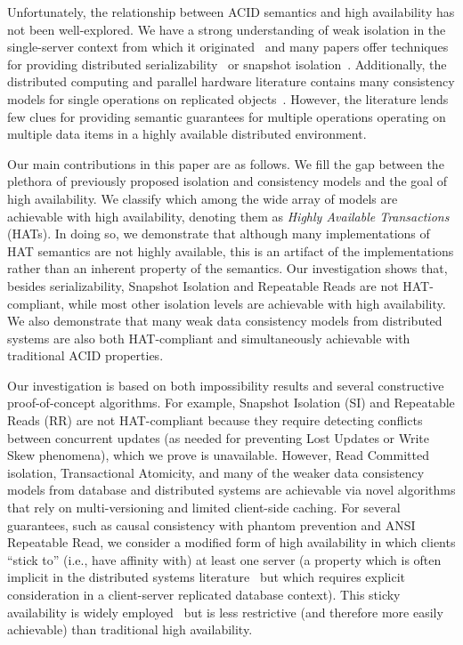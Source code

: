 Unfortunately, the relationship between ACID semantics and high
availability has not been well-explored. We have a strong
understanding of weak isolation in the single-server context from
which it originated~\cite{adya, ansicritique, gray-isolation} and many
papers offer techniques for providing distributed
serializability~\cite{bernstein-book, spanner, daudjee-session,
  hstore, krikellas-bargain, calvin, kemme-classification} or snapshot
isolation~\cite{daudjee-snapshot,generalizedsnapshot, kemme-snapshot,
  walter}. Additionally, the distributed computing and parallel
hardware literature contains many consistency models for single
operations on replicated objects~\cite{pnuts, herlihy-art, eiger, cac,
  sessionguarantees}. However, the literature lends few clues for
providing semantic guarantees for multiple operations operating on
multiple data items in a highly available distributed environment.

Our main contributions in this paper are as follows. We fill the gap
between the plethora of previously proposed isolation and consistency
models and the goal of high availability.  We classify which among the
wide array of models are achievable with high availability, denoting
them as {\em Highly Available Transactions} (HATs). In doing so, we
demonstrate that although many implementations of HAT semantics are
not highly available, this is an artifact of the implementations
rather than an inherent property of the semantics. Our investigation
shows that, besides serializability, Snapshot Isolation and Repeatable
Reads are not HAT-compliant, while most other isolation levels are
achievable with high availability. We also demonstrate that many weak
data consistency models from distributed systems are also both
HAT-compliant and simultaneously achievable with traditional ACID
properties.

Our investigation is based on both impossibility results and several
constructive proof-of-concept algorithms. For example, Snapshot
Isolation (SI) and Repeatable Reads (RR) are not HAT-compliant because
they require detecting conflicts between concurrent updates (as needed
for preventing Lost Updates or Write Skew phenomena), which we prove
is unavailable. However, Read Committed isolation, Transactional
Atomicity, and many of the weaker data consistency models from
database and distributed systems are achievable via novel algorithms
that rely on multi-versioning and limited client-side caching. For
several guarantees, such as causal consistency with phantom prevention
and ANSI Repeatable Read, we consider a modified form of high
availability in which clients ``stick to'' (i.e., have affinity with)
at least one server (a property which is often implicit in the
distributed systems literature~\cite{herlihy-art, eiger, cac} but
which requires explicit consideration in a client-server replicated
database context). This sticky availability is widely
employed~\cite{eiger, vogels-defs} but is less restrictive (and
therefore more easily achievable) than traditional high availability.

